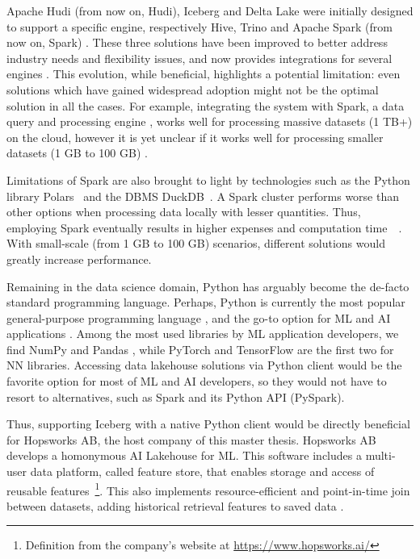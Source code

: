 Apache Hudi (from now on, Hudi), Iceberg and Delta Lake were initially designed to support a specific engine, respectively Hive, Trino and Apache Spark (from now on, Spark) \cite{ApacheHudiVs}. These three solutions have been improved to better address industry needs and flexibility issues, and now provides integrations for several engines \cite{OngoingEvolutionTableFormat}. This evolution, while beneficial, highlights a potential limitation: even solutions which have gained widespread adoption might not be the optimal solution in all the cases. For example, integrating the system with Spark, a data query and processing engine \cite{zahariaApacheSparkUnified2016}, works well for processing massive datasets (1 TB+) on the cloud, however it is yet unclear if it works well for processing smaller datasets (1 GB to 100 GB) \cite{Khazanchi1801362}. 

Limitations of Spark are also brought to light by technologies such as the Python library Polars~\cite{vinkWroteOneFastest2021} and the \gls{DBMS} DuckDB~\cite{raasveldtDuckDBEmbeddableAnalytical2019}. A Spark cluster performs worse than other options when processing data locally with lesser quantities. Thus, employing Spark eventually results in higher expenses and computation time~\cite{ebergenUpdatesH2OAi2023}~\cite{BenchmarkResultsSpark}. With small-scale (from 1 GB to 100 GB) scenarios, different solutions would greatly increase performance.

Remaining in the data science domain, Python has arguably become the de-facto standard programming language. Perhaps, Python is currently the most popular general-purpose programming language \cite{TIOBEIndex, StackOverflowDeveloper, PythonTopLanguage}, and the go-to option for \gls{ML} and \gls{AI} applications \cite{python-machine-learning}. Among the most used libraries by \gls{ML} application developers, we find NumPy and Pandas \cite{StackOverflowDeveloper}, while PyTorch and TensorFlow are the first two for \gls{NN} libraries. Accessing data lakehouse solutions via Python client would be the favorite option for most of \gls{ML} and \gls{AI} developers, so they would not have to resort to alternatives, such as Spark and its Python \gls{API} (PySpark). 

Thus, supporting Iceberg with a native Python client would be directly beneficial for Hopsworks AB, the host company of this master thesis. Hopsworks AB develops a homonymous \gls{AI} Lakehouse for \gls{ML}. This software includes a multi-user data platform, called feature store, that enables storage and access of reusable features~\footnote{Definition from the company's website at \url{https://www.hopsworks.ai/}}. This also implements resource-efficient and point-in-time join between datasets, adding historical retrieval features to saved data \cite{Pettersson1695672}.

